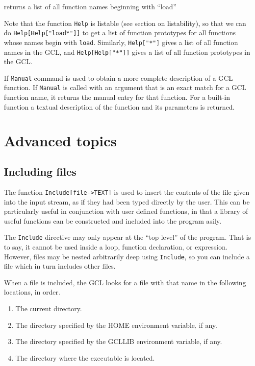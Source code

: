 \noindent
returns a list of all function names beginning with ``load''

Note that the function \verb+Help+ is listable (see section on
listability), so that we can do \verb+Help[Help["load*"]]+ to get a
list of function prototypes for all functions whose names begin with
\verb+load+.  Similarly, \verb+Help["*"]+ gives a list of all function
names in the GCL, and \verb+Help[Help["*"]]+ gives a list of all
function prototypes in the GCL.

If \verb+Manual+ command is used to obtain a more complete description
of a GCL function.  If \verb+Manual+ is called with an argument that
is an exact match for a GCL function name, it returns the manual entry
for that function.  For a built-in function a textual description of
the function and its parameters is returned. 

\chapter{Advanced topics}

\section{Including files}

The function {\tt Include[file->TEXT]} is used to insert the contents of the
file given into the input stream, as if they had been typed directly
by the user.  This can be particularly useful in conjunction with user
defined functions, in that a library of useful functions can be
constructed and included into the program asily.

The {\tt Include} directive may only appear at the ``top level'' of
the program.  That is to say, it cannot be used inside a loop,
function declaration, or expression.  However, files may be nested
arbitrarily deep using {\tt Include}, so you can include a file which
in turn includes other files.
  
When a file is included, the GCL looks for a file with that name in
the following locations, in order.  
\begin{enumerate}
\item The current directory.
\item The directory specified by the HOME environment variable, if any.
\item The directory specified by the GCLLIB environment variable, if any.
\item The directory where the executable is located.
\end{enumerate}

